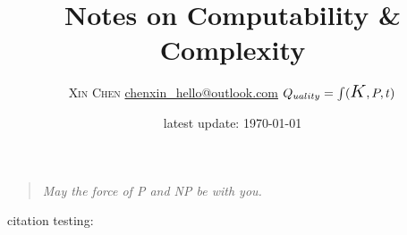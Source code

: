 \documentclass[12pt]{article} %
\title{Notes on Computability \& Complexity}
\author{\textsc{Xin Chen} \qquad \href{mailto:chenxin_hello@outlook.com}{\textsf{chenxin\_hello@outlook.com}}  
	\qquad 
	$Q_{uality} = \int (\text{\Large $K$},P,t)$}
\date{latest update: \today}
\begin{document}
\maketitle

\begin{quotation}
	\itshape May the force of \textsf{P} and \textsf{NP} be with you. 	
\end{quotation}


\tableofcontents


\medskip

citation testing: \cite{Aro.Bar2009}






\clearpage
\printbibliography
{}
\end{document}
